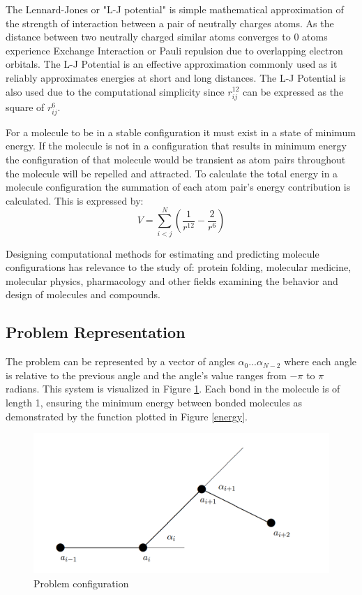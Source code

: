 \documentclass[conference,letterpaper]{IEEEtran}
\begin{document}
\par The Lennard-Jones or "L-J potential" is simple mathematical approximation of the strength of interaction between a pair of neutrally charges atoms. As the distance between two neutrally charged similar atoms converges to 0 atoms experience Exchange Interaction or Pauli repulsion due to overlapping electron orbitals. The L-J Potential is an effective approximation commonly used as it reliably approximates energies at short and long distances. The L-J Potential is also used due to the computational simplicity since $r_{ij}^{12}$ can be expressed as the square of $r_{ij}^6$.

\par For a molecule to be in a stable configuration it must exist in a state of minimum energy. If the molecule is not in a configuration that results in minimum energy the configuration of that molecule would be transient  as atom pairs throughout the molecule will be repelled and attracted. To calculate the total energy in a molecule configuration the summation of each atom pair's energy contribution is calculated. This is expressed by:
\begin{equation}
    V = \sum_{i < j}^{N}(\frac{1}{r^{12}} - \frac{2}{r^{6}})
\end{equation}

Designing computational methods for estimating and predicting molecule configurations has relevance to the study of: protein folding, molecular medicine, molecular physics, pharmacology and other fields examining the behavior and design of molecules and compounds.

\subsection{Problem Representation}
\par
The problem can be represented by a vector of angles $\alpha_{0} ... \alpha_{N-2}$ where each angle is relative to the previous angle and the angle's value ranges from $-\pi$ to $\pi$ radians. This system is visualized in Figure \ref{atom configuration}. Each bond in the molecule is of length 1, ensuring the minimum energy between bonded molecules as demonstrated by the function plotted in Figure \ref{energy}.

\begin{figure}[h]
    \includegraphics[scale=0.3]{configuration}
    \caption{Problem configuration}
    \label{atom configuration}
\end{figure}
\end{document}
